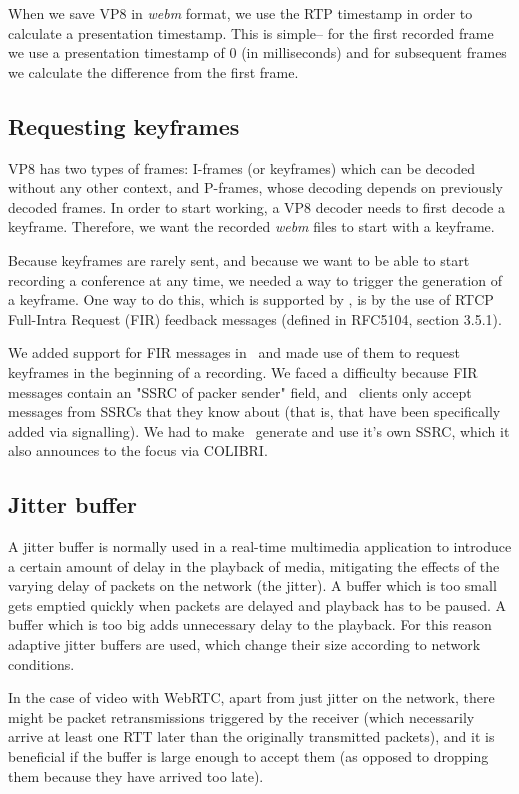 \documentclass[twoside,openright,a4paper,12pt,english]{article}
\begin{document}
When we save VP8 in \emph{webm} format, we use the RTP timestamp in order to calculate
a presentation timestamp. This is simple-- for the first recorded frame we use
a presentation timestamp of 0 (in milliseconds) and for subsequent frames we
calculate the difference from the first frame.


\subsection{Requesting keyframes}
VP8 has two types of frames: I-frames (or keyframes) which can be decoded
without any other context, and P-frames, whose decoding depends on previously
decoded frames. In order to start working, a VP8 decoder needs to first decode a keyframe.
Therefore, we want the recorded \emph{webm} files to start with a keyframe.

Because keyframes are rarely sent, and because we want to be able to start
recording a conference at any time, we needed a way to trigger the generation of a
keyframe. One way to do this, which is supported by \wrtc, is by the use of
RTCP Full-Intra Request (FIR) feedback messages (defined in
RFC5104\cite{rfc5104}, section 3.5.1).

We added support for FIR messages in \lj\ and made use of them to request
keyframes in the beginning of a recording. We faced a difficulty because FIR
messages contain an "SSRC of packer sender" field, and \wrtc\ clients only
accept messages from SSRCs that they know about (that is, that have been
specifically added via signalling). We had to make \jvb\ generate and use it's
own SSRC, which it also announces to the focus via COLIBRI.

\subsection{Jitter buffer}
\label{video-jb}
A jitter buffer is normally used in a real-time multimedia application to
introduce a certain amount of delay in the playback of media,
mitigating the effects of the varying delay of packets on the network
(the jitter). A buffer which is too small gets emptied quickly when packets are
delayed and playback has
to be paused. A buffer which is too big adds unnecessary delay to the playback.
For this reason adaptive jitter buffers are used, which change their
size according to network conditions.

In the case of video with WebRTC, apart from just jitter on the network, there
might be packet retransmissions triggered by the receiver (which necessarily
arrive at least one RTT later than the originally transmitted packets), and it is beneficial if the
buffer is large enough to accept them (as opposed to dropping them because they
have arrived too late).
\end{document}
